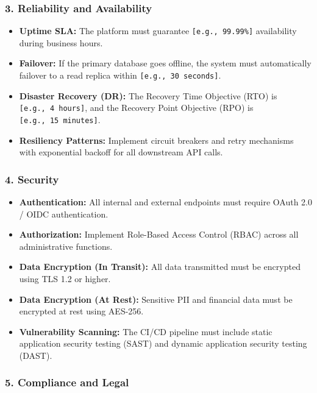 \documentclass[
  11pt,
  openany,
  oneside]{book}
\providecommand{\tightlist}{%
  \setlength{\itemsep}{0pt}\setlength{\parskip}{0pt}}
\begin{document}
\subsubsection{3. Reliability and
Availability}\label{reliability-and-availability}

\begin{itemize}
\tightlist
\item
  \textbf{Uptime SLA:} The platform must guarantee
  \texttt{{[}e.g.,\ 99.99\%{]}} availability during business hours.
\item
  \textbf{Failover:} If the primary database goes offline, the system
  must automatically failover to a read replica within
  \texttt{{[}e.g.,\ 30\ seconds{]}}.
\item
  \textbf{Disaster Recovery (DR):} The Recovery Time Objective (RTO) is
  \texttt{{[}e.g.,\ 4\ hours{]}}, and the Recovery Point Objective (RPO)
  is \texttt{{[}e.g.,\ 15\ minutes{]}}.
\item
  \textbf{Resiliency Patterns:} Implement circuit breakers and retry
  mechanisms with exponential backoff for all downstream API calls.
\end{itemize}

\subsubsection{4. Security}\label{security}

\begin{itemize}
\tightlist
\item
  \textbf{Authentication:} All internal and external endpoints must
  require OAuth 2.0 / OIDC authentication.
\item
  \textbf{Authorization:} Implement Role-Based Access Control (RBAC)
  across all administrative functions.
\item
  \textbf{Data Encryption (In Transit):} All data transmitted must be
  encrypted using TLS 1.2 or higher.
\item
  \textbf{Data Encryption (At Rest):} Sensitive PII and financial data
  must be encrypted at rest using AES-256.
\item
  \textbf{Vulnerability Scanning:} The CI/CD pipeline must include
  static application security testing (SAST) and dynamic application
  security testing (DAST).
\end{itemize}

\subsubsection{5. Compliance and Legal}\label{compliance-and-legal}
\end{document}
